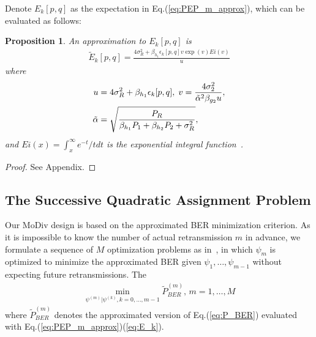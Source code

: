 \documentclass{article}
\newtheorem{proposition}{Proposition}
\begin{document}
Denote $E_k[p,q]$ as the expectation in Eq.(\ref{eq:PEP_m_approx}), which can be
evaluated as follows:
\begin{proposition}
  An approximation to $E_k[p,q]$ is
  \begin{align}
    \tilde{E}_k[p,q] = \frac{4\sigma_R^2
    + \beta_{h_1}\epsilon_k[p,q]v\exp(v)Ei(v)}{u}
    \label{eq:E_k}
  \end{align}
  where
  \begin{subequations}
    \begin{align}
      u & = 4\sigma_R^2 + \beta_{h_1}\epsilon_k[p,q],\;
      v =
      \frac{4\sigma_2^2}{\tilde{\alpha}^2\beta_{g_2}u}, \notag\\
      \tilde{\alpha} & = \sqrt{\frac{P_R}{\beta_{h_1}P_1 +
      \beta_{h_2}P_2+\sigma_R^2}}, \notag
    \end{align}
  \end{subequations}
  and $Ei(x) = \int_x^\infty e^{-t}/tdt$ is the exponential integral
  function~\cite{zwillinger2014table}. 
  \label{prop:E_k}
\end{proposition}
\begin{proof}
  See Appendix.
\end{proof}

\subsection{The Successive Quadratic Assignment Problem}
\label{ssec:qap}
Our MoDiv design is based on the approximated BER minimization criterion. As it
is impossible to know the number of actual retransmission $m$ in advance, we
formulate a sequence of $M$ optimization problems as
in~\cite{harvind2005symbol}, in which $\psi_m$ is optimized to minimize the
approximated BER given $\psi_1,\ldots,\psi_{m-1}$ without expecting future retransmissions. The
\begin{align}
  \min_{\psi^{(m)}|\psi^{(k)},k=0,\ldots,m-1}\tilde{P}_{BER}^{(m)},\,m=1,\ldots,M
  \label{eq:core}
\end{align}
where $\tilde{P}_{BER}^{(m)}$ denotes the approximated version of
Eq.(\ref{eq:P_BER}) evaluated with Eq.(\ref{eq:PEP_m_approx})(\ref{eq:E_k}).
\end{document}

